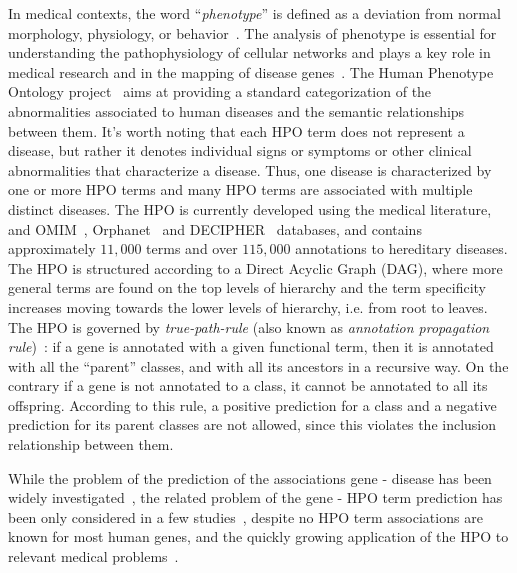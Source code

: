 \documentclass{bioinfo}
\begin{document}
In medical contexts, the word ``{\it phenotype}'' is defined as a deviation from normal morphology, physiology, or behavior~\citep{deepheno}. 
The analysis of phenotype is essential for understanding the pathophysiology of cellular networks and plays a key role in medical research and in the mapping of disease genes~\citep{nick11}. The Human Phenotype Ontology project~\citep{nick8} aims at providing a standard categorization of the abnormalities associated to human diseases and the semantic relationships between them. It's worth noting that each HPO term does not represent a disease, but rather it denotes individual signs or symptoms or other clinical abnormalities that characterize a disease. Thus, one disease is characterized by one or more HPO terms and many HPO terms are associated with multiple distinct diseases. The HPO is currently developed using the medical literature, and OMIM~\citep{omim}, Orphanet~\citep{orphanet} and DECIPHER~\citep{decipher} databases, and contains approximately $11,000$ terms and over $115,000$ annotations to hereditary diseases. 
The HPO is structured according to a Direct Acyclic Graph (DAG), where more general terms are found on the top levels of hierarchy and the term specificity increases moving towards the lower levels of hierarchy, i.e. from root to leaves. The HPO is governed by {\it true-path-rule} (also known as {\it annotation propagation rule})~\citep{nick11}: if a gene is annotated with a given functional term, then it is annotated with all the ``parent'' classes, and with all its ancestors in a recursive way. On the contrary if a gene is not annotated to a class, it cannot be annotated to all its offspring. According to this rule, a positive prediction for a class and a negative prediction for its parent classes are not allowed, since this violates the inclusion relationship between them. 

While the problem of the prediction of the associations gene - disease has been widely investigated~\citep{Moreau12}, the related problem of the gene - HPO term prediction has been only considered  in a few studies~\citep{PHENO15}, despite no HPO term associations are known for most human genes, and the quickly growing application of the HPO to relevant medical problems~\citep{Zemojtel2014,Smedley16}.
\end{document}
